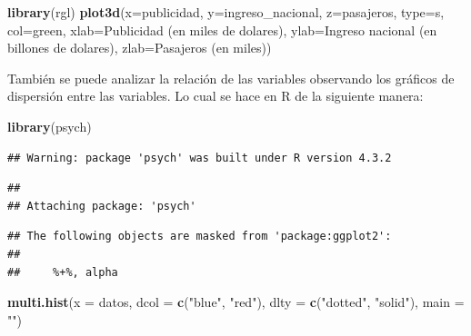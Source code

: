 \documentclass[
]{book}
\newenvironment{Shaded}{\begin{snugshade}}{\end{snugshade}}
\newcommand{\AttributeTok}[1]{\textcolor[rgb]{0.13,0.29,0.53}{#1}}
\newcommand{\FunctionTok}[1]{\textcolor[rgb]{0.13,0.29,0.53}{\textbf{#1}}}
\newcommand{\NormalTok}[1]{#1}
\newcommand{\StringTok}[1]{\textcolor[rgb]{0.31,0.60,0.02}{#1}}
\begin{document}
\begin{Shaded}
\begin{Highlighting}[]
\FunctionTok{library}\NormalTok{(rgl)}
\FunctionTok{plot3d}\NormalTok{(}\AttributeTok{x=}\NormalTok{publicidad, }\AttributeTok{y=}\NormalTok{ingreso\_nacional, }\AttributeTok{z=}\NormalTok{pasajeros, }\AttributeTok{type=}\StringTok{\textquotesingle{}s\textquotesingle{}}\NormalTok{, }\AttributeTok{col=}\StringTok{\textquotesingle{}green\textquotesingle{}}\NormalTok{,}
       \AttributeTok{xlab=}\StringTok{\textquotesingle{}Publicidad (en miles de dolares)\textquotesingle{}}\NormalTok{,}
       \AttributeTok{ylab=}\StringTok{\textquotesingle{}Ingreso nacional (en billones de dolares)\textquotesingle{}}\NormalTok{,}
       \AttributeTok{zlab=}\StringTok{\textquotesingle{}Pasajeros (en miles)\textquotesingle{}}\NormalTok{)}
\end{Highlighting}
\end{Shaded}

También se puede analizar la relación de las variables observando los gráficos de dispersión entre las variables. Lo cual se hace en R de la siguiente manera:

\begin{Shaded}
\begin{Highlighting}[]
\FunctionTok{library}\NormalTok{(psych)}
\end{Highlighting}
\end{Shaded}

\begin{verbatim}
## Warning: package 'psych' was built under R version 4.3.2
\end{verbatim}

\begin{verbatim}
## 
## Attaching package: 'psych'
\end{verbatim}

\begin{verbatim}
## The following objects are masked from 'package:ggplot2':
## 
##     %+%, alpha
\end{verbatim}

\begin{Shaded}
\begin{Highlighting}[]
\FunctionTok{multi.hist}\NormalTok{(}\AttributeTok{x =}\NormalTok{ datos, }\AttributeTok{dcol =} \FunctionTok{c}\NormalTok{(}\StringTok{"blue"}\NormalTok{, }\StringTok{"red"}\NormalTok{), }\AttributeTok{dlty =} \FunctionTok{c}\NormalTok{(}\StringTok{"dotted"}\NormalTok{, }\StringTok{"solid"}\NormalTok{),}
           \AttributeTok{main =} \StringTok{""}\NormalTok{)}
\end{Highlighting}
\end{Shaded}
\end{document}
